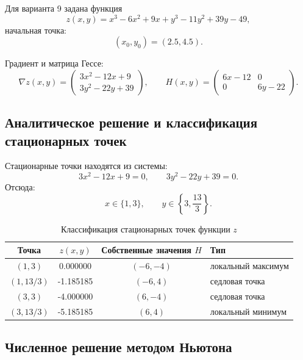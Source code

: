 \documentclass[12pt,a4paper]{article}
\begin{document}
Для варианта 9 задана функция
\begin{equation}
  z(x,y)=x^3-6x^2+9x+y^3-11y^2+39y-49,
\end{equation}
начальная точка:
\begin{equation}
  (x_0,y_0)=(2.5,4.5).
\end{equation}

Градиент и матрица Гессе:
\begin{equation}
  \nabla z(x,y)=
  \begin{pmatrix}
    3x^2-12x+9\\
    3y^2-22y+39
  \end{pmatrix},
  \qquad
  H(x,y)=
  \begin{pmatrix}
    6x-12 & 0\\
    0 & 6y-22
  \end{pmatrix}.
\end{equation}

\subsection{Аналитическое решение и классификация стационарных точек}

Стационарные точки находятся из системы:
\begin{equation}
  3x^2-12x+9=0, \qquad 3y^2-22y+39=0.
\end{equation}
Отсюда:
\begin{equation}
  x\in\{1,3\}, \qquad y\in\left\{3,\frac{13}{3}\right\}.
\end{equation}

\begin{table}[H]
\centering
\caption{Классификация стационарных точек функции $z$}
\begin{tabular}{cccl}
\toprule
Точка & $z(x,y)$ & Собственные значения $H$ & Тип \\
\midrule
$(1,3)$ & 0.000000 & $(-6,-4)$ & локальный максимум \\
$(1,13/3)$ & -1.185185 & $(-6,4)$ & седловая точка \\
$(3,3)$ & -4.000000 & $(6,-4)$ & седловая точка \\
$(3,13/3)$ & -5.185185 & $(6,4)$ & локальный минимум \\
\bottomrule
\end{tabular}
\end{table}

\subsection{Численное решение методом Ньютона}
\end{document}
